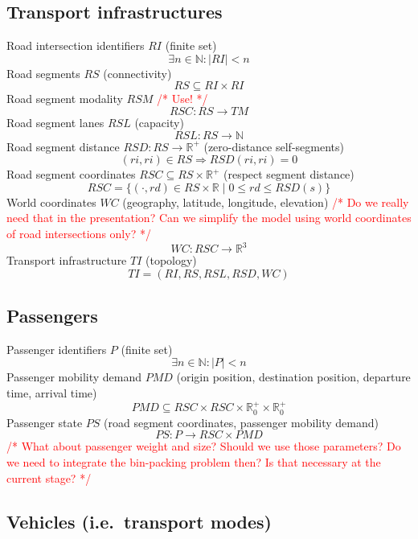 \documentclass[conference]{IEEEtran}
\newcommand{\todo}[1]{\textcolor{red}{/* #1 */}}
\begin{document}
	\subsection{Transport infrastructures}
	\label{transport}
	
	Road intersection identifiers $RI$ (finite set)
	\[
		\exists n \in \mathbb{N} : |RI| < n
	\]
	Road segments $RS$ (connectivity)
	\[
		RS \subseteq RI \times RI
	\]
	Road segment modality $RSM$ \todo{Use!}
	\[
		RSC : RS \rightarrow TM
	\]
	Road segment lanes $RSL$ (capacity)
	\[
		RSL : RS \rightarrow \mathbb{N}
	\]
	Road segment distance $RSD : RS \rightarrow \mathbb{R}^+$ (zero-distance self-segments)
	\[
		(ri, ri) \in RS \Rightarrow  RSD(ri, ri) = 0
	\]
	Road segment coordinates $RSC \subseteq RS \times \mathbb{R}^+$ (respect segment distance)
	\[
		RSC = \{(\cdot, rd) \in RS \times \mathbb{R} \mid 0 \leq rd \leq RSD(s) \}
	\]
	World coordinates $WC$ (geography, latitude, longitude, elevation) \todo{Do we really need that in the presentation? Can we simplify the model using world coordinates of road intersections only?}
	\[
		WC : RSC \rightarrow \mathbb{R}^3
	\]
	Transport infrastructure $TI$ (topology)
	\[
		TI = (RI, RS, RSL, RSD, WC)
	\]
	
	\subsection{Passengers}
	\label{passengers}
	
	Passenger identifiers $P$ (finite set)
	\[
	\exists n \in \mathbb{N} : |P| < n
	\]
	Passenger mobility demand $PMD$ (origin position, destination position, departure time, arrival time)
	\[
		PMD \subseteq RSC \times RSC \times \mathbb{R}_0^+ \times \mathbb{R}_0^+
	\]
	Passenger state $PS$ (road segment coordinates, passenger mobility demand)
	\[
		PS : P \rightarrow RSC \times PMD
	\]
	\todo{What about passenger weight and size? Should we use those parameters? Do we need to integrate the bin-packing problem then? Is that necessary at the current stage?}
	
	\subsection{Vehicles (i.e.\ transport modes)}
	\label{vehicles}
	
\end{document}
